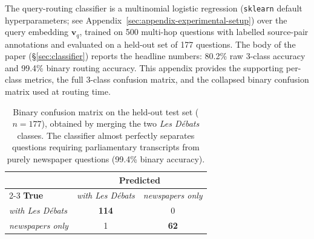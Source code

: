 %

The query-routing classifier is a multinomial logistic regression
(\texttt{sklearn} default hyperparameters; see
Appendix~\ref{sec:appendix-experimental-setup}) over the query embedding
$\mathbf{v}_q$, trained on 500 multi-hop questions with labelled
source-pair annotations and evaluated on a held-out set of 177
questions.
The body of the paper (§\ref{sec:classifier}) reports the headline numbers:
80.2\% raw 3-class accuracy and 99.4\% binary routing accuracy.
This appendix provides the supporting per-class metrics, the full 3-class
confusion matrix, and the collapsed binary confusion matrix used at routing
time.

\begin{table}[htbp]
\centering
\small
\begin{tabular}{l cc}
\toprule
 & \multicolumn{2}{c}{\textbf{Predicted}} \\
\cmidrule(lr){2-3}
\textbf{True}  & \textit{with Les Débats} & \textit{newspapers only} \\
\midrule
\textit{with Les Débats}  & \textbf{114} &   0 \\
\textit{newspapers only}  &    1 & \textbf{62} \\
\bottomrule
\end{tabular}
\caption{Binary confusion matrix on the held-out test set ($n{=}177$),
obtained by merging the two \textit{Les Débats} classes.
The classifier almost perfectly separates questions requiring
parliamentary transcripts from purely newspaper questions
(99.4\% binary accuracy).}
\label{tab:confusion-binary}
\end{table}

